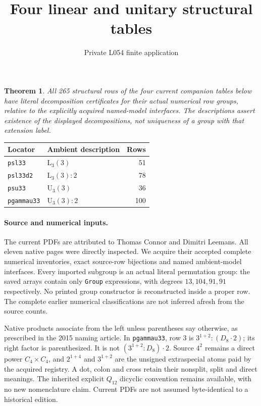 \documentclass[11pt]{article}
\title{Four linear and unitary structural tables}
\author{Private L054 finite application}\date{}
\newtheorem{theorem}{Theorem}
\begin{document}
\maketitle
\begin{theorem}
All 265 structural rows of the four current companion tables below have
literal decomposition certificates for their actual numerical row groups,
relative to the explicitly acquired named-model interfaces. The descriptions
assert existence of the displayed decompositions, not uniqueness of a group
with that extension label.
\end{theorem}
\begin{center}\begin{tabular}{llr}
Locator & Ambient description & Rows\\\hline
\texttt{psl33} & $\mathrm L_3(3)$ &51\\
\texttt{psl33d2} & $\mathrm L_3(3):2$ &78\\
\texttt{psu33} & $\mathrm U_3(3)$ &36\\
\texttt{pgammau33} & $\mathrm U_3(3):2$ &100
\end{tabular}\end{center}

\paragraph{Source and numerical inputs.}
The current PDFs are attributed to Thomas Connor and Dimitri Leemans.
All eleven native pages were directly inspected. We acquire their accepted
complete numerical inventories, exact source-row bijections and named
ambient-model interfaces. Every imported subgroup is an actual literal
permutation group: the saved arrays contain only \texttt{Group} expressions,
with degrees $13,104,91,91$ respectively. No printed group constructor
is reconstructed inside a proper row. The complete earlier numerical
classifications are not inferred afresh from the source counts.

Native products associate from the left unless parentheses say otherwise,
as prescribed in the 2015 naming article. In \texttt{pgammau33}, row 3 is
$3^{1+2}:(D_8\mathbin{\cdot}2)$; its right factor is parenthesized.
It is not $(3^{1+2}:D_8)\mathbin{\cdot}2$. Source $4^2$ remains a direct
power $C_4\times C_4$, and $2^{1+4}$ and $3^{1+2}$ are the unsigned
extraspecial atoms paid by the acquired registry. A dot, colon and cross
retain their nonsplit, split and direct meanings. The inherited explicit
$Q_{12}$ dicyclic convention remains available, with no new nomenclature
claim. Current PDFs are not assumed byte-identical to a historical edition.
\end{document}
